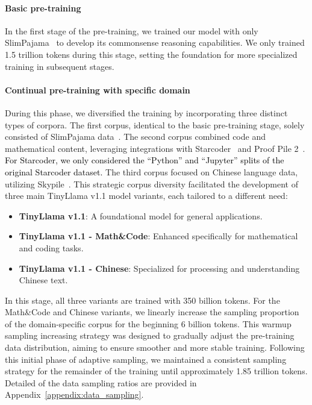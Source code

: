 \documentclass{article}
\begin{document}
\paragraph{Basic pre-training}
%
In the first stage of the pre-training, we trained our model with only SlimPajama~\citep{cerebras2023slimpajama} to develop its commonsense reasoning capabilities. 
%
We only trained 1.5 trillion tokens during this stage, setting the foundation for more specialized training in subsequent stages.
%


\paragraph{Continual pre-training with specific domain}
%
During this phase, we diversified the training by incorporating three distinct types of corpora. The first corpus, identical to the basic pre-training stage, solely consisted of SlimPajama data~\citep{cerebras2023slimpajama}. The second corpus combined code and mathematical content, leveraging integrations with Starcoder~\citep{li2023starcoder} and Proof Pile 2~\citep{azerbayev2023llemma}. 
%
\textcolor{black}{For Starcoder, we only considered the ``Python'' and ``Jupyter'' splits of the original Starcoder dataset.}
%
The third corpus focused on Chinese language data, utilizing Skypile~\citep{wei2023skywork}.  This strategic corpus diversity facilitated the development of three main TinyLlama v1.1 model variants, each tailored to a different need:
\begin{itemize}
\item \textbf{TinyLlama v1.1}: A foundational model for general applications.
\item \textbf{TinyLlama v1.1 - Math\&Code}: Enhanced specifically for mathematical and coding tasks.
\item \textbf{TinyLlama v1.1 - Chinese}: Specialized for processing and understanding Chinese text.
\end{itemize}
%
In this stage, all three variants are trained with 350 billion tokens.
%
For the Math\&Code and Chinese variants, we linearly increase the sampling proportion of the domain-specific corpus for the beginning 6 billion tokens.
%
This warmup sampling increasing strategy was designed to gradually adjust the pre-training data distribution, aiming to ensure smoother and more stable training.
%
Following this initial phase of adaptive sampling, we maintained a consistent sampling strategy for the remainder of the training until approximately 1.85 trillion tokens. Detailed of the data sampling ratios are provided in Appendix~\ref{appendix:data_sampling}.
%
\end{document}
